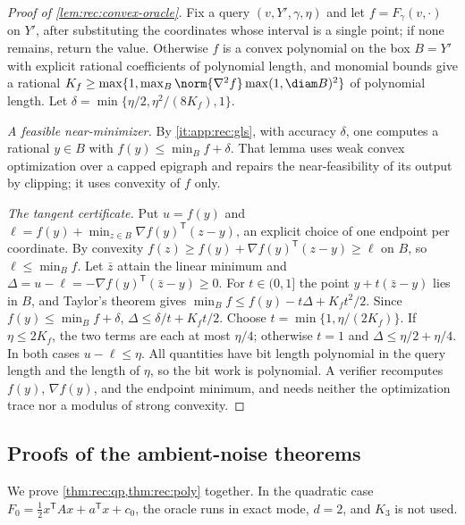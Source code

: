 \begin{proof}[Proof of \cref{lem:rec:convex-oracle}]
Fix a query $(v,Y',\gamma,\eta)$ and let $f=F_\gamma(v,\cdot)$ on $Y'$, after
substituting the coordinates whose interval is a single point; if none
remains, return the value. Otherwise $f$ is a convex polynomial on the box
$B=Y'$ with explicit rational coefficients of polynomial length, and monomial
bounds give a rational
$K_f\ge\max\{1,\max_B\norm{\nabla^2f}\max(1,\diam B)^2\}$ of polynomial
length. Let $\delta=\min\{\eta/2,\eta^2/(8K_f),1\}$.

\emph{A feasible near-minimizer.} By \ref{it:app:rec:gls}, with accuracy
$\delta$, one computes a rational $y\in B$ with $f(y)\le\min_Bf+\delta$. That
lemma uses weak convex optimization over a capped epigraph and repairs the
near-feasibility of its output by clipping; it uses convexity of $f$ only.

\emph{The tangent certificate.} Put $u=f(y)$ and
$\ell=f(y)+\min_{z\in B}\nabla f(y)^{\mathsf T}(z-y)$, an explicit choice of one
endpoint per coordinate. By convexity $f(z)\ge f(y)+\nabla f(y)^{\mathsf T}(z-y)
\ge\ell$ on $B$, so $\ell\le\min_Bf$. Let $\bar z$ attain the linear minimum
and $\Delta=u-\ell=-\nabla f(y)^{\mathsf T}(\bar z-y)\ge0$. For $t\in(0,1]$ the
point $y+t(\bar z-y)$ lies in $B$, and Taylor's theorem gives
$\min_Bf\le f(y)-t\Delta+K_ft^2/2$. Since $f(y)\le\min_Bf+\delta$,
$\Delta\le\delta/t+K_ft/2$. Choose $t=\min\{1,\eta/(2K_f)\}$. If
$\eta\le2K_f$, the two terms are each at most $\eta/4$; otherwise $t=1$ and
$\Delta\le\eta/2+\eta/4$. In both cases $u-\ell\le\eta$. All quantities have
bit length polynomial in the query length and the length of $\eta$, so the
bit work is polynomial. A verifier recomputes $f(y)$, $\nabla f(y)$, and the
endpoint minimum, and needs neither the optimization trace nor a modulus of
strong convexity.
\end{proof}

\subsection{Proofs of the ambient-noise theorems}\label{app:rec:main}

We prove \cref{thm:rec:qp,thm:rec:poly} together. In the quadratic case
$F_0=\frac12x^{\mathsf T}Ax+a^{\mathsf T}x+c_0$, the oracle runs in exact mode,
$d=2$, and $K_3$ is not used.

